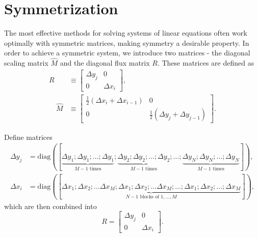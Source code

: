 \documentclass{article}
\numberwithin{equation}{section}
\begin{document}
\pagebreak
\section{Symmetrization}\label{sec:symmetrization}

The most effective methods for solving systems of linear equations often work optimally with symmetric matrices, making symmetry a desirable property. In order to achieve a symmetric system, we introduce two matrices - the diagonal scaling matrix $\hat{M}$ and the diagonal flux matrix $R$. These matrices are defined as
\begin{align*}
R &\equiv\left[\begin{array}{cc}
\Delta y_j & 0 \\
0 & \Delta x_i
\end{array}\right], \\
\quad \hat{M} & \equiv\left[\begin{array}{cc}
\frac{1}{2}\left(\Delta x_i+\Delta x_{i-1}\right) & 0 \\
0 & \frac{1}{2}\left(\Delta y_j+\Delta y_{j-1}\right)
\end{array}\right].
\end{align*}

Define matrices 
\begin{equation*}
\begin{aligned}
	\Delta y_j&=\text{diag}([\underbrace{\Delta y_1; \Delta y_1; \dotsc;\Delta y_1}_{M-1\text{ times}}; \underbrace{\Delta y_2; \Delta y_2; \dotsc;\Delta y_2}_{M-1\text{ times}};\dotsc;\underbrace{\Delta y_N; \Delta y_N; \dotsc;\Delta y_N}_{M-1\text{ times}}]),\\
	\Delta x_i&=\text{diag}([\underbrace{\Delta x_1; \Delta x_2;\dotsc\Delta x_M;\Delta x_1; \Delta x_2;\dotsc\Delta x_M; \dotsc;\Delta x_1; \Delta x_2;\dotsc;\Delta x_M}_{N-1\text{ blocks of } 1,\dotsc,M}]),
\end{aligned}
\end{equation*}
which are then combined into
\begin{equation*}
R =\left[\begin{array}{cc}
\Delta y_j & 0 \\
0 & \Delta x_i
\end{array}\right].
\end{equation*}
\end{document}
